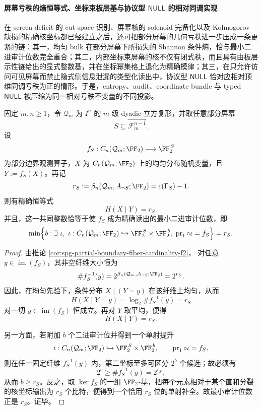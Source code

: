 \paragraph{屏幕亏秩的熵恒等式、坐标束板层基与协议型 \texorpdfstring{$\mathsf{NULL}$}{NULL} 的相对同调实现}
在 screen deficit 的 cut-space 识别、屏幕核的 solenoid 完备化以及 Kolmogorov 缺损的精确核坐标都已经建立之后，还可把部分屏幕的几何亏秩进一步压成一条更紧的链：其一，均匀 bulk 在部分屏幕下所损失的 Shannon 条件熵，恰与最小二进审计位数完全重合；其二，内部坐标束屏幕的核不仅有闭式秩，而且具有由板层示性链给出的显式整数基，并在坐标幂集格上退化为精确模律；其三，在只允许访问可见屏幕而禁止隐式侧信息泄漏的类型化读出中，协议型 \(\mathsf{NULL}\) 恰对应相对顶维同调亏秩为正的情形。于是，entropy、audit、coordinate bundle 与 typed \(\mathsf{NULL}\) 被压缩为同一相对亏秩不变量的不同投影。

\begin{theorem}\label{thm:conclusion-screen-entropy-audit-identity}
固定 \(m,n\ge 1\)，令 \(\mathcal Q_m\) 为 \(I^n\) 的 \(m\)-级 dyadic 立方复形，并取任意部分屏幕
\[
S\subseteq \overrightarrow{\mathcal F_m^{n-1}}.
\]
设
\[
f_S:C_n(\mathcal Q_m;\FF_2)\longrightarrow \FF_2^{\,S}
\]
为部分边界观测算子，\(X\) 为 \(C_n(\mathcal Q_m;\FF_2)\) 上的均匀分布随机变量，且 \(Y:=f_S(X)\)。再记
\[
r_S:=\beta_n(\mathcal Q_m,A_{\neg S};\FF_2)=c(\Gamma_S)-1.
\]
则有精确恒等式
\[
H(X\mid Y)=r_S.
\]
并且，这一共同整数恰等于使 \(f_S\) 成为精确读出的最小二进审计位数，即
\[
\min\Bigl\{
b:\exists\ \iota,\ \iota:C_n(\mathcal Q_m;\FF_2)\hookrightarrow \FF_2^{\,S}\times \FF_2^{\,b},\
\operatorname{pr}_1\circ \iota=f_S
\Bigr\}=r_S.
\]
\end{theorem}

\begin{proof}
由推论 \ref{cor:spg-partial-boundary-fiber-cardinality-f2}，
对任意 \(y\in \operatorname{im}(f_S)\)，其非空纤维大小恒为
\[
\#f_S^{-1}(y)=2^{\beta_n(\mathcal Q_m,A_{\neg S};\FF_2)}=2^{r_S}.
\]
因此，在均匀先验下，条件分布 \(X\mid(Y=y)\) 在该纤维上均匀，从而
\[
H(X\mid Y=y)=\log_2 \#f_S^{-1}(y)=r_S
\]
对一切 \(y\in\operatorname{im}(f_S)\) 恒成立。再对 \(Y\) 取平均，便得
\[
H(X\mid Y)=r_S.
\]

另一方面，若附加 \(b\) 个二进审计位并得到一个单射提升
\[
\iota:C_n(\mathcal Q_m;\FF_2)\hookrightarrow \FF_2^{\,S}\times \FF_2^{\,b},
\qquad
\operatorname{pr}_1\circ\iota=f_S,
\]
则在任一固定纤维 \(f_S^{-1}(y)\) 内，第二坐标至多可区分 \(2^b\) 个候选；故必须有
\[
2^b\ge \#f_S^{-1}(y)=2^{r_S},
\]
从而 \(b\ge r_S\)。反之，取 \(\ker f_S\) 的一组 \(\FF_2\)-基，把每个元素相对于某个直和分裂的核坐标输出为 \(r_S\) 个比特，便得到一个恰用 \(r_S\) 位的单射补全。故最小审计位数正是 \(r_S\)。证毕。
\end{proof}

